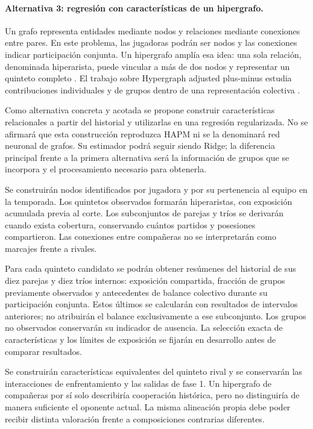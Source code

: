 \paragraph*{Alternativa 3: regresión con características de un hipergrafo.}
Un grafo representa entidades mediante nodos y relaciones mediante conexiones entre pares. En este problema, las jugadoras podrán ser nodos y las conexiones indicar participación conjunta. Un hipergrafo amplía esa idea: una sola relación, denominada hiperarista, puede vincular a más de dos nodos y representar un quinteto completo \cite{bretto2013hypergraph}. El trabajo sobre Hypergraph adjusted plus-minus estudia contribuciones individuales y de grupos dentro de una representación colectiva \cite{josephs2025hypergraphadjustedplusminus}.

Como alternativa concreta y acotada se propone construir características relacionales a partir del historial y utilizarlas en una regresión regularizada. No se afirmará que esta construcción reproduzca HAPM ni se la denominará red neuronal de grafos. Su estimador podrá seguir siendo Ridge; la diferencia principal frente a la primera alternativa será la información de grupos que se incorpora y el procesamiento necesario para obtenerla.

Se construirán nodos identificados por jugadora y por su pertenencia al equipo en la temporada. Los quintetos observados formarán hiperaristas, con exposición acumulada previa al corte. Los subconjuntos de parejas y tríos se derivarán cuando exista cobertura, conservando cuántos partidos y posesiones compartieron. Las conexiones entre compañeras no se interpretarán como marcajes frente a rivales.

Para cada quinteto candidato se podrán obtener resúmenes del historial de sus diez parejas y diez tríos internos: exposición compartida, fracción de grupos previamente observados y antecedentes de balance colectivo durante su participación conjunta. Estos últimos se calcularán con resultados de intervalos anteriores; no atribuirán el balance exclusivamente a ese subconjunto. Los grupos no observados conservarán su indicador de ausencia. La selección exacta de características y los límites de exposición se fijarán en desarrollo antes de comparar resultados.

Se construirán características equivalentes del quinteto rival y se conservarán las interacciones de enfrentamiento y las salidas de fase 1. Un hipergrafo de compañeras por sí solo describiría cooperación histórica, pero no distinguiría de manera suficiente el oponente actual. La misma alineación propia debe poder recibir distinta valoración frente a composiciones contrarias diferentes.


